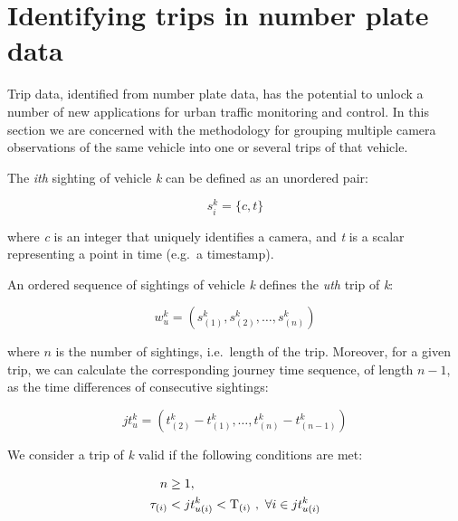 \section{Identifying trips in number plate data}
\label{s.trips}
Trip data, identified from number plate data, has the potential to unlock a number of new applications for urban traffic monitoring and control. In this section we are concerned with the methodology for grouping multiple camera observations of the same vehicle into one or several trips of that vehicle.

The \emph{ith} sighting of vehicle \emph{k} can be defined as an unordered pair:

\begin{equation} \label{e.sighting}
s^{k}_{i} = \{ c, t \}
\end{equation}

where \emph{c} is an integer that uniquely identifies a camera, and \emph{t} is a scalar representing a point in time (e.g.\ a timestamp).

An ordered sequence of sightings of vehicle \emph{k} defines the \emph{uth} trip of \emph{k}:

\begin{equation} \label{e.trip}
w^{k}_{u} = \left(s^{k}_{(1)}, s^{k}_{(2)}, \dots , s^{k}_{(n)}\right)
\end{equation}

where \( n \) is the number of sightings, i.e.\ length of the trip. Moreover, for a given trip, we can calculate the corresponding journey time sequence, of length \(n-1\), as the time differences of consecutive sightings:

\begin{equation} \label{e.journeytime}
jt^{k}_{u} = \left(t^{k}_{(2)} - t^{k}_{(1)}, \ldots, t^{k}_{(n)} - t^{k}_{(n-1)} \right)
\end{equation}

We consider a trip of \emph{k} valid if the following conditions are met:

\begin{align}
n &\ge 1 , \label{e.trip.constraints.1} \\
\tau_{(i)} &< jt^{k}_{u(i)} < \mathrm{T}_{(i)} \ , \ \forall i \in jt^{k}_{u(i)} \label{e.trip.constraints.2}
\end{align}

